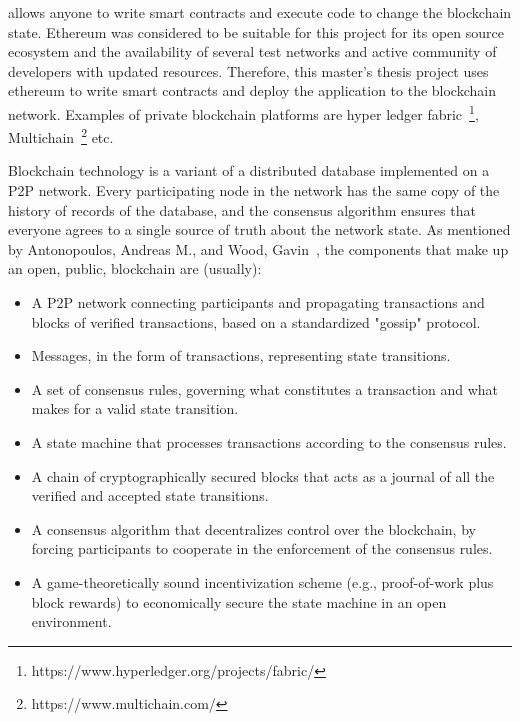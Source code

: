 allows anyone to write smart contracts and execute code to change the
blockchain state. Ethereum was considered to be suitable for this project for
its open source ecosystem and the availability of several test networks and
active community of developers with updated resources. Therefore, this master's
thesis project uses ethereum to write smart contracts and deploy the
application to the blockchain network. Examples of private blockchain
platforms are hyper ledger
fabric~\footnote{https://www.hyperledger.org/projects/fabric/},
Multichain~\footnote{https://www.multichain.com/} etc.\par
Blockchain technology is a variant of a distributed database implemented on a
P2P network. Every participating node in the network has the same copy of the
history of records of the database, and the consensus algorithm ensures that
everyone agrees to a single source of truth about the network state. 
As mentioned by Antonopoulos, Andreas M., and Wood,
Gavin~\cite{MasteringEthereum}, the components that make up an open, public,
blockchain are (usually):
\begin{itemize}
	\item A P2P network connecting participants and propagating transactions
		and blocks of verified transactions, based on a standardized "gossip"
		protocol. 
	\item Messages, in the form of transactions, representing state
		transitions.
	\item A set of consensus rules, governing what constitutes a transaction
		and what makes for a valid state transition.
	\item A state machine that processes transactions according to the
		consensus rules.
	\item A chain of cryptographically secured blocks that acts as a journal of
		all the verified and accepted state transitions.
	\item A consensus algorithm that decentralizes control over the blockchain,
		by forcing participants to cooperate in the enforcement of the
		consensus rules. 
	\item A game-theoretically sound incentivization scheme (e.g.,
		proof-of-work plus block rewards) to economically secure the state
		machine in an open environment.
\end{itemize}

